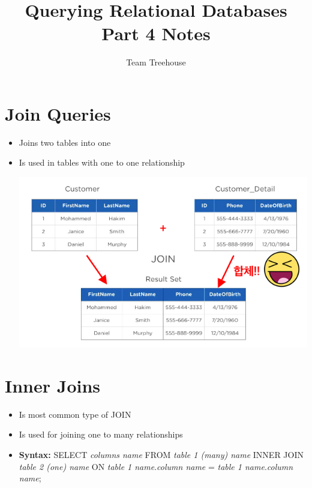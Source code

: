 \documentclass[12pt]{article}
\begin{document}
\title{Querying Relational Databases Part 4 Notes}
\author{Team Treehouse}
\maketitle

\bigskip

\section{Join Queries}

\bigskip

\begin{itemize}
    \item Joins two tables into one
    \item Is used in tables with one to one relationship

    \begin{center}
    \includegraphics[width=0.8\linewidth]{images/part_4_notes_1.png}
    \end{center}
\end{itemize}

\bigskip

\section{Inner Joins}

\bigskip

\begin{itemize}
    \item Is most common type of JOIN
    \item Is used for joining one to many relationships
    \item \textbf{Syntax:} SELECT \textit{columns name} FROM \textit{table 1 (many) name}
    INNER JOIN \textit{table 2 (one) name} ON \textit{table 1 name}.\textit{column name} = \textit{table 1 name}.\textit{column name};
\end{itemize}
\end{document}
